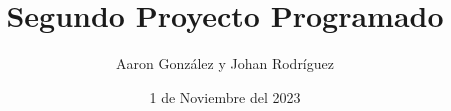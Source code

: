 \documentclass{lib/preamble}
\begin{document}

\title{Segundo Proyecto Programado}
\author{Aaron González y Johan Rodríguez}
\date{1 de Noviembre del 2023}

\maketitle









\end{document}
